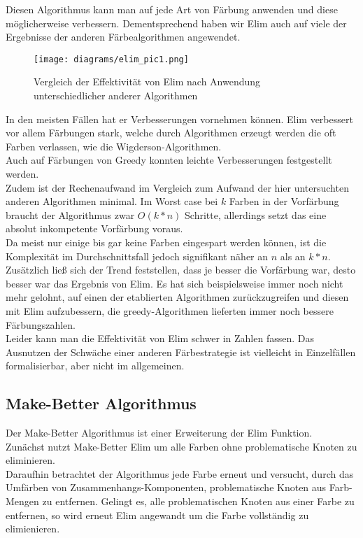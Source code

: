 \documentclass[11pt]{article}
\begin{document}
Diesen Algorithmus kann man auf jede Art von Färbung anwenden und diese möglicherweise verbessern. Dementsprechend haben wir Elim auch auf viele der Ergebnisse der anderen Färbealgorithmen angewendet. \\
\begin{figure}
  \texttt{[image: diagrams/elim\_pic1.png]}
  \caption{Vergleich der Effektivität von Elim nach Anwendung unterschiedlicher anderer Algorithmen}
  \label{fig:elim1}
\end{figure}
In den meisten Fällen hat er Verbesserungen vornehmen können. 
Elim verbessert vor allem Färbungen stark, welche durch Algorithmen erzeugt werden die oft Farben verlassen, wie die Wigderson-Algorithmen. \\
Auch auf Färbungen von Greedy konnten leichte Verbesserungen festgestellt werden. \\
Zudem ist der Rechenaufwand im Vergleich zum Aufwand der hier untersuchten anderen Algorithmen minimal. Im Worst case bei $k$ Farben
in der Vorfärbung braucht der Algorithmus zwar $O(k*n)$ Schritte, allerdings setzt das eine absolut inkompetente Vorfärbung voraus. \\
Da meist nur einige bis gar keine Farben eingespart werden können, ist die Komplexität im Durchschnittsfall jedoch signifikant näher an $n$ als an $k*n$. \\
Zusätzlich ließ sich der Trend feststellen, dass je besser die Vorfärbung war, desto besser war das Ergebnis von Elim. Es hat sich beispielsweise immer noch nicht mehr gelohnt, auf einen der etablierten
Algorithmen zurückzugreifen und diesen mit Elim aufzubessern, die greedy-Algorithmen lieferten immer noch bessere Färbungszahlen. \\
Leider kann man die Effektivität von Elim schwer in Zahlen fassen. Das Ausnutzen der Schwäche einer anderen Färbestrategie ist vielleicht in Einzelfällen formalisierbar, aber nicht im allgemeinen.

\subsection{Make-Better Algorithmus} %

Der Make-Better Algorithmus ist einer Erweiterung der Elim Funktion. \\
Zunächst nutzt Make-Better Elim um alle Farben ohne problematische Knoten zu eliminieren. \\
Daraufhin betrachtet der Algorithmus jede Farbe erneut und versucht, durch das Umfärben von Zusammenhangs-Komponenten, problematische Knoten aus Farb-Mengen zu entfernen.
Gelingt es, alle problematischen Knoten aus einer Farbe zu entfernen, so wird erneut Elim angewandt um die Farbe vollständig zu elimienieren. \\
\end{document}
